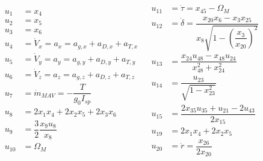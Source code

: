 \begin{align} \label{eq:unAuxEq1}
\begin{split} 
u_{1}&=x_{4}\\
u_{2}&=x_{5}\\
u_{3}&=x_{6} \\
u_{4}&=\dot{V}_{x}=a_{x}=a_{g,x}+a_{D,x}+a_{T,x}\\
u_{5}&=\dot{V}_{y}=a_{y}=a_{g,y}+a_{D,y}+a_{T,y}\\
u_{6}&=\dot{V}_{z}=a_{z}=a_{g,z}+a_{D,z}+a_{T,z}\\
u_{7} &=\dot{m}_{MAV}=-\dfrac{T}{g_{0}I_{sp}}\\
u_{8}&=2x_{1}x_{4}+2x_{2}x_{5}+2x_{3}x_{6}\\
u_{9}&=\dfrac{3}{2}\dfrac{x_{9}u_{8}}{x_{8}}\\
u_{10} &= \Omega_{M} \\
\end{split}
&
\begin{split}
u_{11} &= \dot{\tau}=x_{45}-\Omega_{M}\\
u_{12} &= \dot{\delta} = \dfrac{x_{20}x_{6}-x_{3}x_{25}}{x_{8} \sqrt{1-\left(\dfrac{x_{3}}{x_{20}}\right)^{2}}}\\
u_{13} &= \dfrac{x_{24}u_{48}-x_{48}u_{24}}{x_{48}^{2}+x_{24}^{2}}\\
u_{14} &= \dfrac{u_{23}}{\sqrt{1-x_{23}^{2}}}\\
u_{15} &= \dfrac{2x_{35}u_{35}+u_{21}-2u_{43}}{2x_{15}} \\
u_{19} &= 2x_{1}x_{4}+2x_{2}x_{5}\\
u_{20} &= \dot{r} = \dfrac{x_{26}}{2 x_{20}}\\
\end{split}
\end{align}


